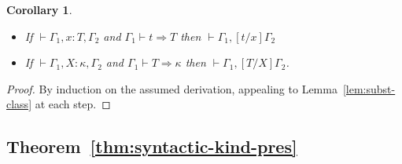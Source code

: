 \documentclass{article}
\newcommand{\tpsynth}[0]{\Rightarrow}
\newtheorem{corollary}[theorem]{Corollary}
\begin{document}
\begin{corollary}
  \begin{itemize}
  \item If \(\vdash \Gamma_1,x:T,\Gamma_2\) and \(\Gamma_1 \vdash t \tpsynth T\)
    then \(\vdash \Gamma_1,[t/x]\Gamma_2\)
    
  \item If \(\vdash \Gamma_1,X:\kappa,\Gamma_2\) and \(\Gamma_1 \vdash T
    \tpsynth \kappa\) then \(\vdash \Gamma_1,[T/X]\Gamma_2\).
  \end{itemize}
\end{corollary}
\begin{proof}
  By induction on the assumed derivation, appealing to
  Lemma~\ref{lem:subst-class} at each step.
\end{proof}

\subsection{Theorem~\ref{thm:syntactic-kind-pres}}
\end{document}
